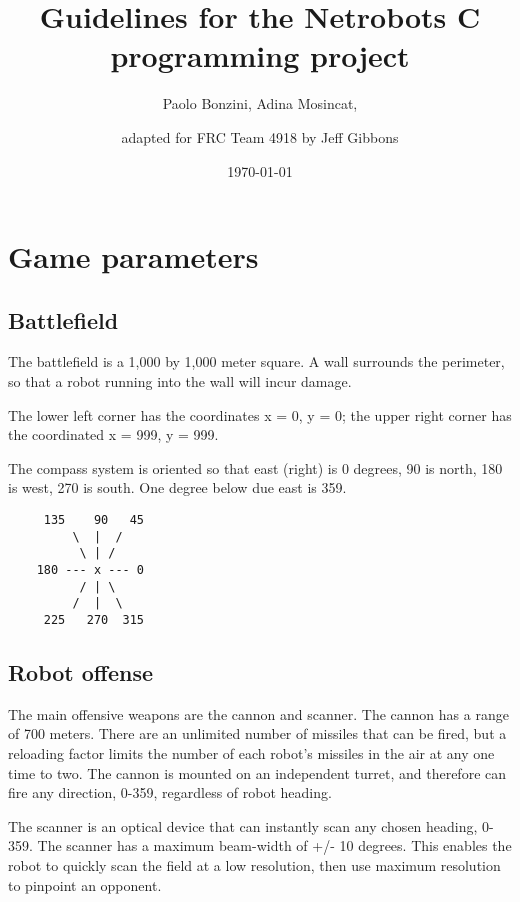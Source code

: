 \documentclass{article}
\title{Guidelines for the Netrobots C programming project}
\author{Paolo Bonzini, Adina Mosincat,
        \and
        adapted for FRC Team 4918 by Jeff Gibbons}
\date{\today}
\begin{document}
\maketitle

\section{Game parameters}

\subsection{Battlefield}

        The battlefield is a 1,000 by 1,000 meter square.  A wall
        surrounds the perimeter, so that a robot running into the wall
        will incur damage.

        The lower left corner has the coordinates x = 0, y = 0; the upper
        right corner has the coordinated x = 999, y = 999.

        The compass system is oriented so that east (right) is 0
        degrees, 90 is north, 180 is west, 270 is south.  One degree
        below due east is 359.


\begin{verbatim}
     135    90   45
         \  |  / 
          \ | /
    180 --- x --- 0
          / | \
         /  |  \ 
     225   270  315
\end{verbatim}



\subsection{Robot offense}

        The main offensive weapons are the cannon and scanner.  The
        cannon has a range of 700 meters.  There are an unlimited number
        of missiles that can be fired, but a reloading factor limits the
        number of each robot's missiles in the air at any one time to two.
        The cannon is mounted on an independent turret, and therefore can
        fire any direction, 0-359, regardless of robot heading.

        The scanner is an optical device that can instantly scan any
        chosen heading, 0-359.  The scanner has a maximum beam-width of  
        +/- 10 degrees.  This enables the robot to quickly scan the field
        at a low resolution, then use maximum resolution to pinpoint an
        opponent.
\end{document}
